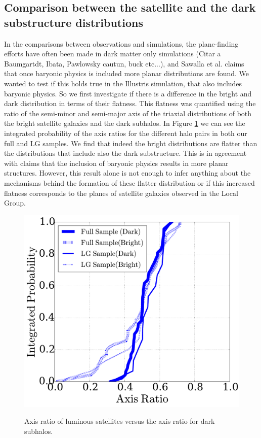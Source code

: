 \documentclass{emulateapj}
\begin{document}
\subsection{Comparison between the satellite and the dark substructure distributions}
\label{DarkBright}
In the comparisons between observations and simulations, the plane-finding efforts have often been made in dark matter only simulations (Citar a Baumgartdt, Ibata, Pawlowsky cautun, buck etc...), and Sawalla et al. claims that once baryonic physics is included more planar distributions are found.
We wanted to test if this holds true in the Illustris simulation, that also includes baryonic physics. So we first investigate if there is a difference in the bright and dark distribution in terms of their flatness. 
This flatness was quantified using the ratio of the semi-minor and semi-major axis of the triaxial distributions of both the bright satellite galaxies and the dark subhalos. 
In Figure \ref{fig:StreamPlaneOrbit} we can see the integrated probability of the axis ratios for the different halo pairs in both our full and LG samples. 
We find that indeed the bright distributions are flatter than the distributions that include also the dark substructure.
This is in agreement with claims that the inclusion of baryonic physics results in more planar structures. 
However, this result alone is not enough to infer anything about the mechanisms behind the formation of these flatter distribution or if this increased flatness corresponds to the planes of satellite galaxies observed in the Local Group.\\
\begin{figure}
\centering
\includegraphics[width=\hsize]{axratio_dark_bright.pdf}\\
\caption{Axis ratio of luminous satellites versus the axis ratio for
  dark subhalos.}
\label{fig:StreamPlaneOrbit}
\end{figure}
\end{document}
